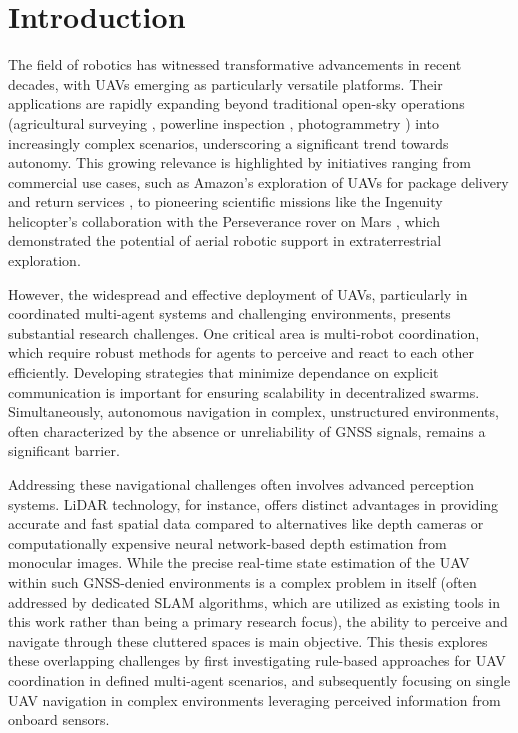 
\chapter{Introduction\label{chap:introduction}}
The field of robotics has witnessed transformative advancements in recent decades, with \ac{UAV}s emerging as particularly versatile platforms. 
Their applications are rapidly expanding beyond traditional open-sky operations (agricultural surveying \cite{agricultural_survey}, powerline inspection \cite{powerline_inspection}, photogrammetry \cite{photogrammetry}) into increasingly complex scenarios, underscoring a significant trend towards autonomy. 
This growing relevance is highlighted by initiatives ranging from commercial use cases, such as Amazon's exploration of \ac{UAV}s for package delivery and return services \cite{InsiderIntelligence_DroneDelivery}, to pioneering scientific missions like 
  the Ingenuity helicopter's collaboration with the Perseverance rover on Mars \cite{NASA_Ingenuity}, which demonstrated the potential of aerial robotic support in extraterrestrial exploration.

However, the widespread and effective deployment of \ac{UAV}s, particularly in coordinated multi-agent systems and challenging environments, presents substantial research challenges. 
One critical area is multi-robot coordination, which require robust methods for agents to perceive and react to each other efficiently. 
Developing strategies that minimize dependance on explicit communication is important for ensuring scalability in decentralized swarms. 
Simultaneously, autonomous navigation in complex, unstructured environments, often characterized by the absence or unreliability of \ac{GNSS} signals, remains a significant barrier.

Addressing these navigational challenges often involves advanced perception systems. 
\ac{LiDAR} technology, for instance, offers distinct advantages in providing accurate and fast spatial data compared to alternatives like depth cameras or computationally expensive neural network-based depth estimation from monocular images. 
While the precise real-time state estimation of the \ac{UAV} within such \ac{GNSS}-denied environments is a complex problem in itself (often addressed by dedicated \ac{SLAM} algorithms, which are utilized as existing tools in this work rather than being a primary research focus), the ability to perceive and navigate through these cluttered spaces is main objective. 
This thesis explores these overlapping challenges by first investigating rule-based approaches for \ac{UAV} coordination in defined multi-agent scenarios, and subsequently focusing on single \ac{UAV} navigation in complex environments leveraging perceived information from onboard sensors.



